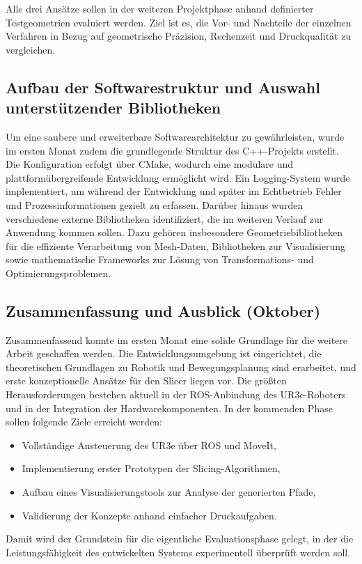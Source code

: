 \documentclass[
	paper=a4,
	fontsize=11pt,
	parskip=half,
	headings=normal,
	bibliography=totoc,
	listof=totoc
]{scrartcl}
\begin{document}
	Alle drei Ansätze sollen in der weiteren Projektphase anhand definierter Testgeometrien evaluiert werden.
	Ziel ist es, die Vor- und Nachteile der einzelnen Verfahren in Bezug auf geometrische Präzision, Rechenzeit und Druckqualität zu vergleichen.

\subsection{Aufbau der Softwarestruktur und Auswahl unterstützender Bibliotheken}
	Um eine saubere und erweiterbare Softwarearchitektur zu gewährleisten, wurde im ersten Monat zudem die grundlegende Struktur des C++-Projekts erstellt.
	Die Konfiguration erfolgt über CMake, wodurch eine modulare und plattformübergreifende Entwicklung ermöglicht wird.
	Ein Logging-System wurde implementiert, um während der Entwicklung und später im Echtbetrieb Fehler und Prozessinformationen gezielt zu erfassen.
	Darüber hinaus wurden verschiedene externe Bibliotheken identifiziert, die im weiteren Verlauf zur Anwendung kommen sollen.
	Dazu gehören insbesondere Geometriebibliotheken für die effiziente Verarbeitung von Mesh-Daten, Bibliotheken zur Visualisierung sowie mathematische Frameworks zur Lösung von Transformations- und Optimierungsproblemen.

\subsection{Zusammenfassung und Ausblick (Oktober)}
	Zusammenfassend konnte im ersten Monat eine solide Grundlage für die weitere Arbeit geschaffen werden.
	Die Entwicklungsumgebung ist eingerichtet, die theoretischen Grundlagen zu Robotik und Bewegungsplanung sind erarbeitet, und erste konzeptionelle Ansätze für den Slicer liegen vor.
	Die größten Herausforderungen bestehen aktuell in der ROS-Anbindung des UR3e-Roboters und in der Integration der Hardwarekomponenten.
	In der kommenden Phase sollen folgende Ziele erreicht werden:

	\begin{itemize}
		\item Vollständige Ansteuerung des UR3e über ROS und MoveIt,
		\item Implementierung erster Prototypen der Slicing-Algorithmen,
		\item Aufbau eines Visualisierungstools zur Analyse der generierten Pfade,
		\item Validierung der Konzepte anhand einfacher Druckaufgaben.
	\end{itemize}
	Damit wird der Grundstein für die eigentliche Evaluationsphase gelegt, in der die Leistungsfähigkeit des entwickelten Systems experimentell überprüft werden soll.
\end{document}
